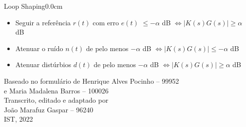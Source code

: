 \documentclass[portuguese,10pt,3col]{cheatsheet}
\begin{document}
\begin{multicols}{3}
\begin{cheatsheetbox}{Loop Shaping}{0.0cm}
    \begin{itemize}
        \item Seguir a referência $r(t)$ com erro $e(t)$ $\leq -\alpha$ dB $\Leftrightarrow |K(s)G(s)| \geq \alpha$ dB
        \item Atenuar o ruído $n(t)$ de pelo menos $-\alpha$ dB $\Leftrightarrow |K(s)G(s)| \leq -\alpha$ dB
        \item Atenuar distúrbios $d(t)$ de pelo menos $-\alpha$ dB $\Leftrightarrow |K(s)G(s)| \geq \alpha$ dB
    \end{itemize}
\end{cheatsheetbox}

\small
\raggedleft
Baseado no formulário de Henrique Alves Pocinho -- 99952 \\
e Maria Madalena Barros -- 100026 \\
Transcrito, editado e adaptado por \\
João Marafuz Gaspar -- 96240 \\
IST, 2022

\end{multicols}
\end{document}
